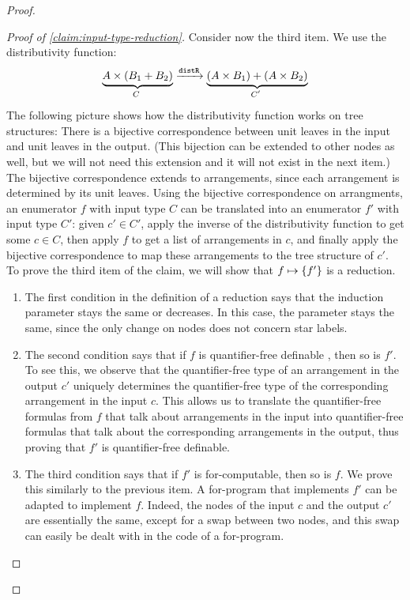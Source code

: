 \begin{proof}
\begin{proof}[Proof of \cref{claim:input-type-reduction}]
Consider now the third item. We  use the distributivity function: 
\begin{align*}
\myunderbrace{A \times (B_1+B_2)}{$C$} \xrightarrow {\distrterm} \myunderbrace{(A \times B_1) + (A \times B_2)}{$C'$}
\end{align*}
The following picture shows how the distributivity function works on tree structures:
There is a bijective correspondence between unit leaves in the input and unit leaves in the output. (This bijection can be extended to other nodes as well, but we will not need this extension and it will not exist in the next item.) The bijective correspondence extends to arrangements, since each arrangement is determined by its unit leaves.  Using the bijective correspondence on arrangments, an enumerator $f$ with input type $C$ can be translated into an enumerator $f'$ with input type $C'$: given $c' \in C'$, apply the inverse of the distributivity function to get some $c \in C$,  then apply $f$ to get a list of arrangements in $c$, and finally apply the bijective correspondence to map these  arrangements to the tree structure of $c'$.  To prove the third item of the claim, we will show that $f \mapsto \{f'\}$ is a  reduction.
\begin{enumerate}
    \item The first condition in the definition of a reduction says that the induction parameter stays the same or decreases.  In this case, the parameter stays the same, since the only change on nodes does not concern star labels.
    \item The second condition says that if $f$ is quantifier-free definable , then so is $f'$. To see this, we observe that the quantifier-free type of an arrangement in the output $c'$ uniquely  determines  the quantifier-free type of the corresponding arrangement in the input $c$. This allows us to translate the quantifier-free formulas from $f$ that talk about arrangements in the input into quantifier-free formulas that talk about the corresponding arrangements in the output, thus proving that $f'$ is quantifier-free definable.
    \item The third condition says that if $f'$ is for-computable, then so is $f$. We prove this similarly to the previous item. A for-program that implements $f'$ can be adapted to implement $f$. Indeed, the nodes of the input $c$ and the output $c'$ are essentially the same, except for a swap between two nodes, and this swap can easily be dealt with in the code of a for-program.
\end{enumerate}


\end{proof}
\end{proof}
